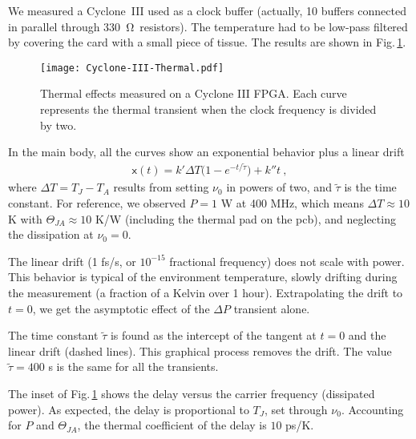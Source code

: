 \documentclass{article}
\newcommand{\ohm}{\ensuremath{\mathrm{\Omega}}}
\begin{document}
We measured a Cyclone~III used as a clock buffer (actually, 10 buffers connected in parallel through 330~\ohm\ resistors).  The temperature had to be low-pass filtered by covering the card with a small piece of tissue.
The results are shown in Fig.\,\ref{fig:Cyclone-III-Thermal-effect}.
%
\begin{figure}[t]
\centering\texttt{[image: Cyclone-III-Thermal.pdf]}
\caption{Thermal effects measured on a Cyclone III FPGA\@.  Each curve represents the thermal transient when the clock frequency is divided by two.}
\label{fig:Cyclone-III-Thermal-effect}
\end{figure}

In the main body, all the curves show an exponential behavior plus a linear drift
\begin{gather}
\mathsf{x}(t)=k'\Delta T\big(1-e^{-t/\tilde{\tau}}\big)+k''t~,
\end{gather}
where $\Delta T=T_J-T_A$ results from setting $\nu_0$ in powers of two, and $\tilde{\tau}$ is the time constant.  For reference, we observed $P=1$ W at 400 MHz, which means $\Delta T\approx10$ K with $\Theta_{JA}\approx10$ K/W (including the thermal pad on the pcb), and neglecting the dissipation at $\nu_0=0$.

The linear drift (1 fs/s, or $10^{-15}$ fractional frequency) does not scale with power.  This behavior is typical of the environment temperature, slowly drifting during the measurement (a fraction of a Kelvin over 1 hour).
Extrapolating the drift to $t=0$, we get the asymptotic effect of the $\Delta P$ transient alone.  

The time constant $\tilde{\tau}$ is found as the intercept of the tangent at $t=0$ and the linear drift (dashed lines).  This graphical process removes the drift.  The value $\tilde{\tau}=400$ s is  the same for all the transients.

The inset of Fig.\,\ref{fig:Cyclone-III-Thermal-effect} shows the delay versus the carrier frequency (dissipated power).  As expected, the delay is proportional to $T_J$, set through $\nu_0$.  
Accounting for $P$ and $\Theta_{JA}$, the thermal coefficient of the delay is $10$ ps/K\@. 
\end{document}
